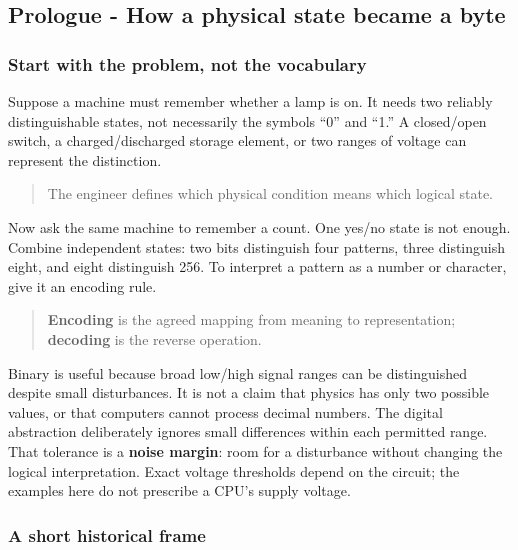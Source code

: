 \subsection{Prologue - How a physical state became a byte}\label{05-engine-i-ch001-prologue---how-a-physical-state-became-a-byte}

\hypertarget{05-engine-i-ch001-prologue---how-a-physical-state-became-a-byte}{}

\subsubsection{Start with the problem, not the vocabulary}\label{05-engine-i-ch001-start-with-the-problem-not-the-vocabulary}

\hypertarget{05-engine-i-ch001-start-with-the-problem-not-the-vocabulary}{}

Suppose a machine must remember whether a lamp is on. It needs two reliably distinguishable states, not necessarily the symbols ``0'' and ``1.'' A closed/open switch, a charged/discharged storage element, or two ranges of voltage can represent the distinction.

\begin{quote}
The engineer defines which physical condition means which logical state.
\end{quote}

Now ask the same machine to remember a count. One yes/no state is not enough. Combine independent states: two bits distinguish four patterns, three distinguish eight, and eight distinguish 256. To interpret a pattern as a number or character, give it an encoding rule.

\begin{quote}
\textbf{Encoding} is the agreed mapping from meaning to representation; \textbf{decoding} is the reverse operation.
\end{quote}

Binary is useful because broad low/high signal ranges can be distinguished despite small disturbances. It is not a claim that physics has only two possible values, or that computers cannot process decimal numbers. The digital abstraction deliberately ignores small differences within each permitted range. That tolerance is a \textbf{noise margin}: room for a disturbance without changing the logical interpretation. Exact voltage thresholds depend on the circuit; the examples here do not prescribe a CPU's supply voltage.

\subsubsection{A short historical frame}\label{05-engine-i-ch001-a-short-historical-frame}

